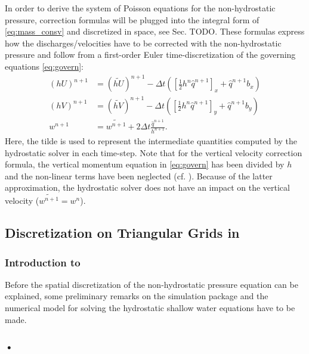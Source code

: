 In order to derive the system of Poisson equations for the non-hydrostatic pressure, correction formulas will be plugged into the integral form of \eqref{eq:mass_consv} and discretized in space, see Sec. TODO. These formulas express how the discharges/velocities have to be corrected with the non-hydrostatic pressure and follow from a first-order Euler time-discretization of the governing equations \eqref{eq:govern}:
\begin{align}
(hU)^{n+1}&= (\widetilde{hU})^{n+1} -\Delta t \left(\left[\frac{1}{2}h^{n}\hat{q}^{n+1}\right]_x+\hat q^{n+1}b_x\right)
\\
(hV)^{n+1}&= (\widetilde{hV})^{n+1} -\Delta t \left(\left[\frac{1}{2}h^{n}\hat{q}^{n+1}\right]_y+\hat q^{n+1}b_y\right)
\\
w^{n+1}&= \widetilde{w^{n+1}}+ 2\Delta t \frac{\hat q^{n+1}}{h^{n+1}}.
\end{align}
Here, the tilde is used to represent the intermediate quantities computed by the hydrostatic solver in each time-step. Note that for the vertical velocity correction formula, the vertical momentum equation in  \eqref{eq:govern} has been divided by $h$ and the non-linear terms have been neglected (cf. \cite{cui}). Because of the latter approximation, the hydrostatic solver does not have an impact on the vertical velocity ($\widetilde{w^{n+1}}=w^{n}$). 





\subsection{Discretization on Triangular Grids in \samoa}

\subsubsection*{Introduction to \samoa}
Before the spatial discretization of the non-hydrostatic pressure equation can be explained, some preliminary remarks on the simulation package \samoa and the numerical model for solving the hydrostatic shallow water equations have to be made.






\subsubsection{•}


